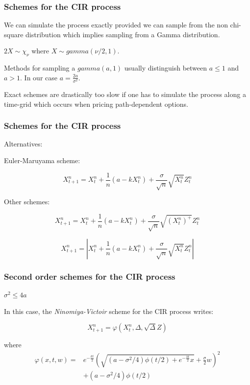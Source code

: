 \documentclass[12pt]{beamer}
\begin{document}
\begin{frame}
\frametitle{Schemes for the CIR process}
We can simulate the process exactly provided we can sample from the non chi-square distribution which implies sampling from a Gamma distribution. 
\vspace{0.5cm}

$2X \sim \chi_\nu$ where $X \sim gamma(\nu/2,1)$. 
\vspace{0.5cm}

Methods for sampling a $gamma(a, 1)$ usually distinguish between $a \leq 1$ and $a > 1$. In our case $a = \frac{2a}{\sigma^2}$.
\vspace{0.5cm}

Exact schemes are drastically too slow if one has to simulate the process along a time-grid which occurs when pricing path-dependent options.
	
\end{frame}

\begin{frame}
\frametitle{Schemes for the CIR process}
Alternatives:
\vspace{0.5cm}

Euler-Maruyama scheme: 

$$ X_{t + 1}^n = X_t^n + \frac{1}{n}(a - kX_t^n) + \frac{\sigma}{\sqrt{n}}\sqrt{X_t^n}Z_t^n$$

Other schemes: 

$$ X_{t + 1}^n = X_t^n + \frac{1}{n}(a - kX_t^n) + \frac{\sigma}{\sqrt{n}}\sqrt{(X_t^n)^+}Z_t^n$$

$$ X_{t + 1}^n = |X_t^n + \frac{1}{n}(a - kX_t^n) + \frac{\sigma}{\sqrt{n}}\sqrt{X_t^n}Z_t^n|$$
\end{frame}

\begin{frame}
\frametitle{Second order schemes for the CIR process}
\textbf{\Large{$\sigma^2 \leq 4a$}} 
\vspace{0.5cm}

In this case, the \textit{Ninomiya-Victoir} scheme for the CIR process writes:

$$ X_{t + 1}^n = \varphi(X_t^n, \Delta, \sqrt{\Delta}Z)$$

where 
\begin{align*}
\varphi(x, t, w) = & e^{-\frac{kt}{2}}(\sqrt{(a - \sigma^2/4)\phi(t/2) +  e^{-\frac{kt}{2}}x} + \frac{\sigma}{2}w)^2 \\ 
                   & + (a - \sigma^2/4)\phi(t/2)
\end{align*}

\end{frame}
\end{document}
